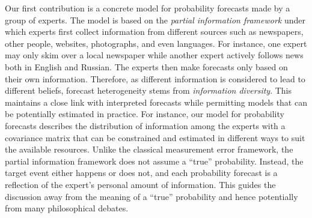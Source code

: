 \documentclass[11pt]{article}
\theoremstyle{definition}
\theoremstyle{definition}
\begin{document}
Our first contribution is a concrete model for probability forecasts made by a group of experts. The model is based on the \textit{partial information framework} under which experts first collect information from different sources such as newspapers, other people, websites, photographs, and even languages. For instance, one expert may only skim over a local newspaper while another expert actively follows news both in English and Russian. The experts then make forecasts only based on their own information.
Therefore, as different information is considered to lead to different beliefs, forecast heterogeneity stems from \textit{information diversity}. This maintains a close link with interpreted forecasts while permitting models that can be potentially estimated in practice. For instance, our model for probability forecasts describes the distribution of information among the experts with a covariance matrix that can be constrained and estimated in different ways to suit the available resources.  Unlike the classical measurement error framework, the partial information framework does not assume a ``true'' probability. Instead, the target event either happens or does not, and each probability forecast is a reflection of the expert's personal amount of information. This guides the discussion away from the meaning of a ``true'' probability and hence potentially from many philosophical debates.

\end{document}
